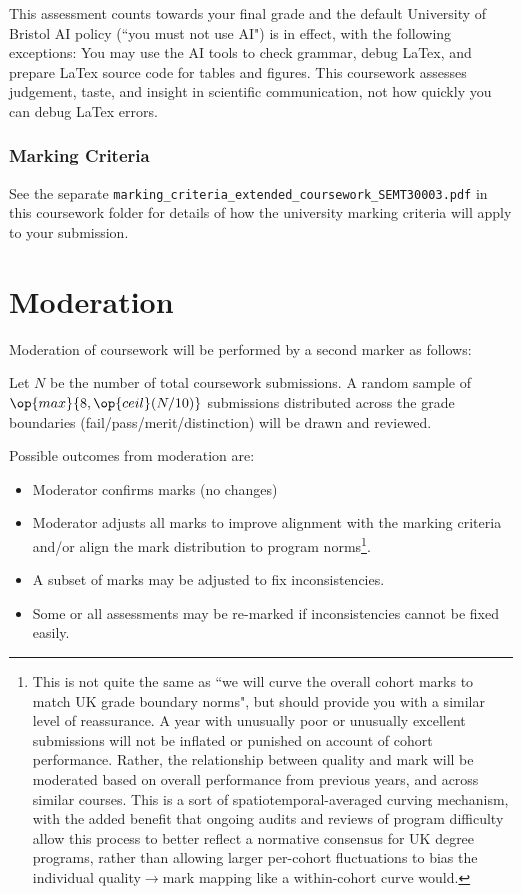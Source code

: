 \documentclass[11pt]{article}
\begin{document}
This assessment counts towards your final grade and the default University of Bristol AI policy (``you must not use AI") is in effect, with the following exceptions: You may use the AI tools to check grammar, debug LaTex, and prepare LaTex source code for tables and figures. This coursework assesses judgement, taste, and insight in scientific communication, not how quickly you can debug LaTex errors.

\vspace{-0.5\baselineskip}
\subsubsection*{Marking Criteria}

See the separate
\texttt{marking\_criteria\_extended\_coursework\_SEMT30003.pdf} 
in this coursework folder for details of how the university marking criteria will apply to your submission.

\clearpage
\section*{Moderation}

Moderation of coursework will be performed by a second marker as follows: 

Let $N$ be the number of total coursework submissions. A random sample of $\op{max}\{8,\op{ceil}(N/10)\}$ submissions distributed across the grade boundaries (fail/pass/merit/distinction) will be drawn and reviewed. 

Possible outcomes from moderation are:\setlength{\itemsep}{-2mm}
\begin{itemize}\setlength{\itemsep}{-2mm}
\item Moderator confirms marks (no changes)
\item Moderator adjusts all marks to improve alignment with the marking criteria and/or align the mark distribution to program norms\footnote{This is not quite the same as ``we will curve the overall cohort marks to match UK grade boundary norms", but should provide you with a similar level of reassurance. A year with unusually poor or unusually excellent submissions will not be inflated or punished on account of cohort performance. Rather, the relationship between quality and mark will be moderated based on overall performance from previous years, and across similar courses. This is a sort of spatiotemporal-averaged curving mechanism, with the added benefit that ongoing audits and reviews of program difficulty allow this process to better reflect a normative consensus for UK degree programs, rather than allowing larger per-cohort fluctuations to bias the individual quality$\to$mark mapping like a within-cohort curve would.}.
\item A subset of marks may be adjusted to fix inconsistencies.
\item Some or all assessments may be re-marked if inconsistencies cannot be fixed easily.
\end{itemize}
\end{document}
